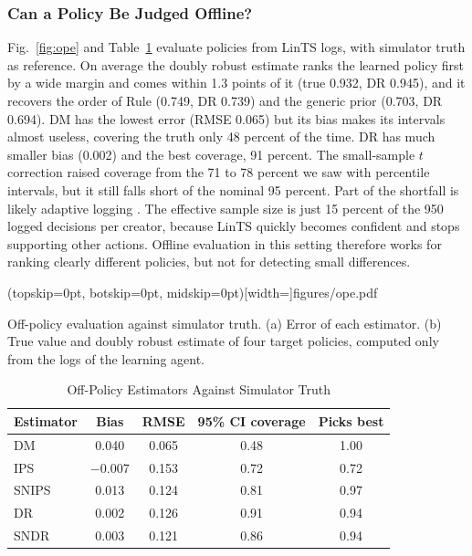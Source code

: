 \documentclass{ieeeaccess}
\begin{document}
\subsubsection{Can a Policy Be Judged Offline?}
Fig.~\ref{fig:ope} and Table~\ref{tab:ope} evaluate policies from LinTS logs, with simulator truth as reference. On average the doubly robust estimate ranks the learned policy first by a wide margin and comes within 1.3 points of it (true 0.932, DR 0.945), and it recovers the order of Rule (0.749, DR 0.739) and the generic prior (0.703, DR 0.694). DM has the lowest error (RMSE 0.065) but its bias makes its intervals almost useless, covering the truth only 48 percent of the time. DR has much smaller bias (0.002) and the best coverage, 91 percent. The small-sample $t$ correction raised coverage from the 71 to 78 percent we saw with percentile intervals, but it still falls short of the nominal 95 percent. Part of the shortfall is likely adaptive logging \cite{hadad2021}. The effective sample size is just 15 percent of the 950 logged decisions per creator, because LinTS quickly becomes confident and stops supporting other actions. Offline evaluation in this setting therefore works for ranking clearly different policies, but not for detecting small differences.

\Figure[t!](topskip=0pt, botskip=0pt, midskip=0pt)[width=\textwidth]{figures/ope.pdf}
{\parbox[t]{0.91\textwidth}{\raggedright Off-policy evaluation against simulator truth. (a) Error of each estimator. (b) True value and doubly robust estimate of four target policies, computed only from the logs of the learning agent.}\label{fig:ope}}

\begin{table}[t]
\caption{Off-Policy Estimators Against Simulator Truth}
\label{tab:ope}
\setlength{\tabcolsep}{4pt}
\centering
\begin{tabular}{|l|c|c|c|c|}
\hline
Estimator & Bias & RMSE & 95\% CI coverage & Picks best \\
\hline
DM & 0.040 & 0.065 & 0.48 & 1.00 \\
IPS & $-$0.007 & 0.153 & 0.72 & 0.72 \\
SNIPS & 0.013 & 0.124 & 0.81 & 0.97 \\
DR & 0.002 & 0.126 & 0.91 & 0.94 \\
SNDR & 0.003 & 0.121 & 0.86 & 0.94 \\
\hline
\end{tabular}
\end{table}
\end{document}
